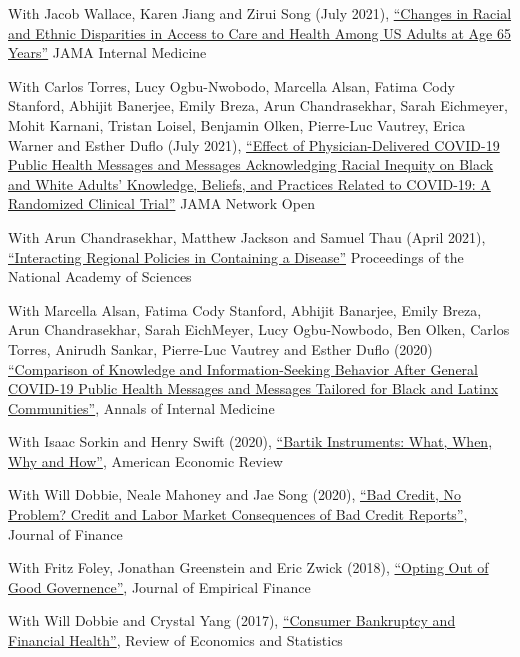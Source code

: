 \documentclass[letterpaper]{article}
\renewenvironment{itemize}{
  \begin{list}{}
    { \setlength{\itemsep}{5pt}
      \setlength{\parsep}{0pt}
      \setlength{\topsep}{0pt}
      \setlength{\leftmargin}{0em} } }{
  \end{list}}
\begin{document}
\begin{itemize}
\item With Jacob Wallace, Karen Jiang and Zirui Song (July 2021), \href{https://jamanetwork.com/journals/jamainternalmedicine/article-abstract/2782345}{``Changes in Racial and Ethnic Disparities in Access to Care and Health Among US Adults at Age 65 Years''} JAMA Internal Medicine
\item With Carlos Torres, Lucy Ogbu-Nwobodo, Marcella Alsan, Fatima Cody Stanford, Abhijit Banerjee, Emily Breza, Arun Chandrasekhar, Sarah Eichmeyer, Mohit Karnani, Tristan Loisel, Benjamin Olken, Pierre-Luc Vautrey, Erica Warner and Esther Duflo (July 2021), \href{https://jamanetwork.com/journals/jamanetworkopen/fullarticle/2781934}{``Effect of Physician-Delivered COVID-19 Public Health Messages and Messages Acknowledging Racial Inequity on Black and White Adults’ Knowledge, Beliefs, and Practices Related to COVID-19: A Randomized Clinical Trial''} JAMA Network Open
\item With Arun Chandrasekhar, Matthew Jackson and Samuel Thau (April 2021), \href{https://arxiv.org/abs/2008.10745}{``Interacting Regional Policies in Containing a Disease''} Proceedings of the National Academy of Sciences
\item With Marcella Alsan, Fatima Cody Stanford, Abhijit Banarjee, Emily Breza, Arun Chandrasekhar, Sarah EichMeyer, Lucy Ogbu-Nowbodo, Ben Olken, Carlos Torres, Anirudh Sankar, Pierre-Luc Vautrey and Esther Duflo (2020) \href{https://www.acpjournals.org/doi/10.7326/M20-6141}{``Comparison of Knowledge and Information-Seeking Behavior After General COVID-19 Public Health Messages and Messages Tailored for Black and Latinx Communities''}, Annals of Internal Medicine
\item With Isaac Sorkin and Henry Swift (2020), \href{http://paulgp.github.io/papers/bartik_gpss.pdf}{``Bartik Instruments: What, When, Why and How''}, American Economic Review
\item With Will Dobbie, Neale Mahoney and Jae Song (2020), \href{https://papers.ssrn.com/sol3/papers.cfm?abstract_id=2844316}{``Bad Credit, No Problem? Credit and Labor Market Consequences of Bad Credit Reports''}, Journal of Finance
\item With Fritz Foley, Jonathan Greenstein and Eric Zwick (2018), \href{http://www.nber.org/papers/w19953}{``Opting Out of Good Governence''}, Journal of Empirical Finance
\item With Will Dobbie and Crystal Yang (2017), \href{http://www.nber.org/papers/w21032}{``Consumer Bankruptcy and Financial Health''}, Review of Economics and Statistics

\end{itemize}
\end{document}

